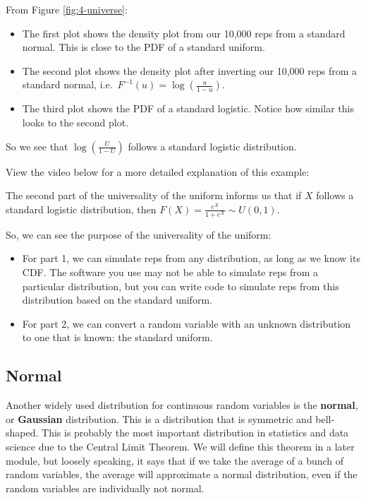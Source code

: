 \documentclass[
]{book}
\providecommand{\tightlist}{%
  \setlength{\itemsep}{0pt}\setlength{\parskip}{0pt}}
\begin{document}
From Figure \ref{fig:4-universe}:

\begin{itemize}
\tightlist
\item
  The first plot shows the density plot from our 10,000 reps from a standard normal. This is close to the PDF of a standard uniform.
\item
  The second plot shows the density plot after inverting our 10,000 reps from a standard normal, i.e.~\(F^{-1}(u) = \log (\frac{u}{1-u})\).
\item
  The third plot shows the PDF of a standard logistic. Notice how similar this looks to the second plot.
\end{itemize}

So we see that \(\log (\frac{U}{1-U})\) follows a standard logistic distribution.

View the video below for a more detailed explanation of this example:

The second part of the universality of the uniform informs us that if \(X\) follows a standard logistic distribution, then \(F(X) = \frac{e^X}{1 + e^X} \sim U(0,1)\).

So, we can see the purpose of the universality of the uniform:

\begin{itemize}
\tightlist
\item
  For part 1, we can simulate reps from any distribution, as long as we know its CDF. The software you use may not be able to simulate reps from a particular distribution, but you can write code to simulate reps from this distribution based on the standard uniform.
\item
  For part 2, we can convert a random variable with an unknown distribution to one that is known: the standard uniform.
\end{itemize}

\hypertarget{normdist}{%
\subsection{Normal}\label{normdist}}

Another widely used distribution for continuous random variables is the \textbf{normal}, or \textbf{Gaussian} distribution. This is a distribution that is symmetric and bell-shaped. This is probably the most important distribution in statistics and data science due to the Central Limit Theorem. We will define this theorem in a later module, but loosely speaking, it says that if we take the average of a bunch of random variables, the average will approximate a normal distribution, even if the random variables are individually not normal.
\end{document}
